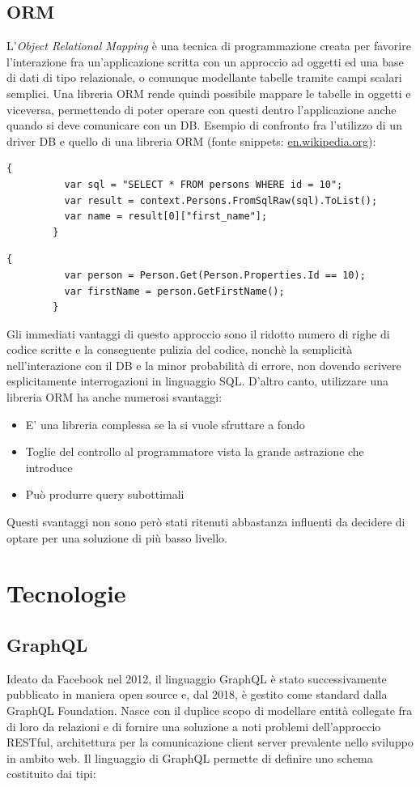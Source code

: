\documentclass[a4paper, 12pt]{report}
\begin{document}
    \section{ORM}
      L'\emph{Object Relational Mapping} è una tecnica di programmazione creata per favorire l'interazione fra un'applicazione scritta con un approccio ad oggetti ed una base di dati di tipo relazionale, o comunque modellante tabelle tramite campi scalari semplici.
      Una libreria ORM rende quindi possibile mappare le tabelle in oggetti e viceversa, permettendo di poter operare con questi dentro l'applicazione anche quando si deve comunicare con un DB.
      Esempio di confronto fra l'utilizzo di un driver DB e quello di una libreria ORM (fonte snippets: \href{https://en.wikipedia.org/wiki/Object%E2%80%93relational_mapping}{en.wikipedia.org}):
      \begin{Verbatim}[samepage=true]
        {
          var sql = "SELECT * FROM persons WHERE id = 10";
          var result = context.Persons.FromSqlRaw(sql).ToList();
          var name = result[0]["first_name"];
        }
      \end{Verbatim}
      \begin{Verbatim}[samepage=true]
        {
          var person = Person.Get(Person.Properties.Id == 10);
          var firstName = person.GetFirstName();
        }
      \end{Verbatim}
      Gli immediati vantaggi di questo approccio sono il ridotto numero di righe di codice scritte e la conseguente pulizia del codice, nonchè la semplicità nell'interazione con il DB e la minor probabilità di errore, non dovendo scrivere esplicitamente interrogazioni in linguaggio SQL.
      D'altro canto, utilizzare una libreria ORM ha anche numerosi svantaggi:
      \begin{itemize}
        \item E' una libreria complessa se la si vuole sfruttare a fondo
        \item Toglie del controllo al programmatore vista la grande astrazione che introduce
        \item Può produrre query subottimali
      \end{itemize}
      Questi svantaggi non sono però stati ritenuti abbastanza influenti da decidere di optare per una soluzione di più basso livello.
    \newpage
  \chapter{Tecnologie}
    \section{GraphQL}
      Ideato da Facebook nel 2012, il linguaggio GraphQL è stato successivamente pubblicato in maniera open source e, dal 2018, è gestito come standard dalla GraphQL Foundation.
      Nasce con il duplice scopo di modellare entità collegate fra di loro da relazioni e di fornire una soluzione a noti problemi dell'approccio RESTful, architettura per la comunicazione client server prevalente nello sviluppo in ambito web.
      Il linguaggio di GraphQL permette di definire uno schema costituito dai tipi:
\end{document}
